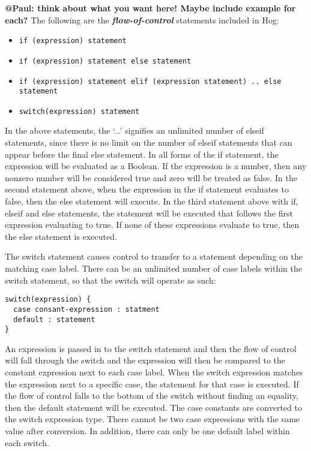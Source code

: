 \documentclass{book}
\begin{document}
\textbf{@Paul: think about what you want here! Maybe include example for each?} The
following are the \textbf{\emph{flow-of-control}} statements included in Hog:

\begin{itemize}
  \item[] \tt if (expression) statement \rm
  \item[] \tt if (expression) statement else statement \rm
  \item[] \tt if (expression) statement elif (expression statement) .. else 
  statement \rm
  \item[] \tt switch(expression) statement \rm
\end{itemize}

In the above statements, the ‘...’ signifies an unlimited number of elseif
statements, since there is no limit on the number of elseif statements that can
appear before the final else statement. In all forms of the if statement, the
expression will be evaluated as a Boolean. If the expression is a number, then any
non­zero number will be considered true and zero will be treated as false. In the
second statement above, when the expression in the if statement evaluates to false,
then the else statement will execute. In the third statement above with if, elseif
and else statements, the statement will be executed that follows the first
expression evaluating to true. If none of these expressions evaluate to true, then
the else statement is executed.

The switch statement causes control to transfer to a statement depending on the
matching case label. There can be an unlimited number of case labels within the
switch statement, so that the switch will operate as such:

\begin{verbatim}
switch(expression) {
  case consant-expression : statment
  default : statement
}
\end{verbatim}

An expression is passed in to the switch statement and then the flow of control
will fall through the switch and the expression will then be compared to the
constant expression next to each case label. When the switch expression matches the
expression next to a specific case, the statement for that case is executed. If the
flow of control falls to the bottom of the switch without finding an equality, then
the default statement will be executed. The case constants are converted to the
switch expression type. There cannot be two case expressions with the same value
after conversion. In addition, there can only be one default label within each
switch.
\end{document}
